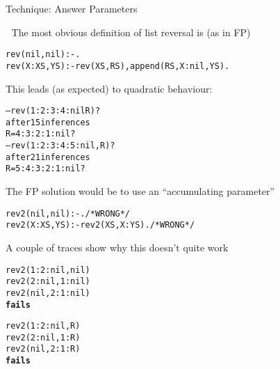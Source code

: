 \documentclass{popl}
\def\user#1{{#1}}
\newenvironment{smalltt}{\begin{alltt}\smaller}{\end{alltt}}
\def\fails{\textrm{\textbf{fails}}}
\begin{document}
\begin{foil} 
\begin{cframed}
Technique: Answer Parameters
\end{cframed}

The most obvious definition of list reversal is (as in FP)
\begin{smalltt}
        rev(nil, nil) :- .
        rev(X:XS, YS) :- rev(XS, RS), append(RS, X:nil, YS).
\end{smalltt}

This leads (as expected) to quadratic behaviour:
\begin{smalltt}
        -- \user{rev(1:2:3:4:nil R)?}
        after 15 inferences 
        R = 4 : 3 : 2 : 1 : nil ?
        -- \user{rev(1:2:3:4:5:nil, R)?}
        after 21 inferences 
        R = 5 : 4 : 3 : 2 : 1 : nil ?
\end{smalltt}

The FP solution would be to use an ``accumulating parameter''
\begin{smalltt}
        rev2(nil, nil) :- .                     /* WRONG */
        rev2(X:XS, YS) :- rev2(XS, X:YS).       /* WRONG */
\end{smalltt}

A couple of traces show why this doesn't quite work
\begin{smalltt}
        rev2(1:2:nil, nil) 
        rev2(2:nil, 1:nil) 
        rev2(nil, 2:1:nil) 
        \fails
        
        rev2(1:2:nil, R) 
        rev2(2:nil, 1:R) 
        rev2(nil, 2:1:R) 
        \fails
\end{smalltt}
\end{foil}
\end{document}

